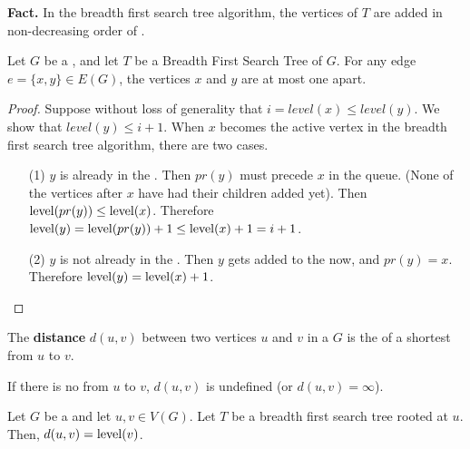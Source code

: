 \documentclass[english, 11pt]{article}
\begin{document}
\textbf{Fact.} In the breadth first search tree algorithm, the vertices of $T$ are added in non-decreasing order of .

\begin{thrm}\label{fundamentalbfst}
Let $G$ be a  , and let $T$ be a Breadth First Search Tree of $G$. For any edge $e = \{x,y\} \in E(G)$, the vertices $x$ and $y$ are at most one  apart.
\end{thrm}

\begin{proof}
 Suppose without loss of generality that $i = level(x) \leq level(y)$. We show that $level(y) \leq i+1$. When $x$ becomes the active vertex in the breadth first search tree algorithm, there are two cases.
 \begin{itemize}
   \item[(1)] $y$ is already in the . Then $pr(y)$ must precede $x$ in the queue. (None of the vertices after $x$ have had their children added yet). Then $\operatorname{level}(pr(y)) \leq \operatorname{level}(x)$. Therefore $\operatorname{level}(y) = \operatorname{level}(pr(y)) + 1 \leq \operatorname{level}(x) + 1 = i + 1$.
   \item[(2)] $y$ is not already in the . Then $y$ gets added to the  now, and $pr(y) = x$. Therefore $\operatorname{level}(y) = \operatorname{level}(x) + 1$.
 \end{itemize}
\end{proof}

\begin{defn}[distance]\label{distance}
The \textbf{distance} $d(u,v)$ between two vertices $u$ and $v$ in a  $G$ is the  of a shortest  from $u$ to $v$.
\end{defn}

If there is no  from $u$ to $v$, $d(u,v)$ is undefined (or $d(u,v) = \infty$).

\begin{thrm}
  Let $G$ be a   and let $u,v \in V(G)$. Let $T$ be a breadth first search tree rooted at $u$. Then, $d(u,v) = \operatorname{level}(v)$.
\end{thrm}
\end{document}
